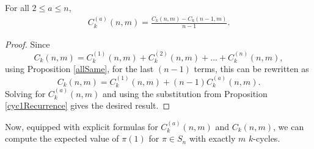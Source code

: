 \begin{lemma}
  \label{cycRecurrenceWithFixedBeginning}
  For all $2 \leq a \leq n$, \begin{align}
    C_k^{(a)}(n,m) = \frac{C_k(n, m) - C_k(n-1, m)}{n - 1}.
  \end{align}
\end{lemma}
\begin{proof}
  Since \begin{equation}
    C_k(n, m) = C_k^{(1)}(n, m) + C_k^{(2)}(n, m) + \dots + C_k^{(n)}(n, m),
  \end{equation} using Proposition \ref{allSame}, for the last $(n-1)$ terms,
  this can be rewritten as \begin{equation}
    C_k(n, m) = C_k^{(1)}(n, m) + (n-1)C_k^{(a)}(n, m).
  \end{equation}
  Solving for $C_k^{(a)}(n, m)$ and using the substitution from Proposition
  \ref{cyc1Recurrence} gives the desired result.
\end{proof}
Now, equipped with explicit formulas for $C_k^{(a)}(n,m)$ and $C_k(n,m)$, we
can compute the expected value of $\pi(1)$ for $\pi \in S_n$ with exactly $m$
$k$-cycles.
